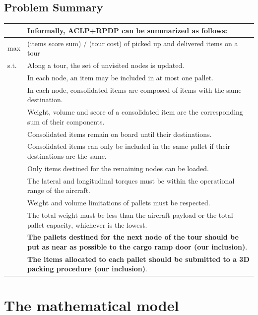 \documentclass[preprint,authoryear]{elsarticle}
\begin{document}
\subsection{Problem Summary}


\bgroup
\def\arraystretch{1.2}
\begin{table}[H]
	\centering
	\small
	\begin{tabular}{MT}
		&Informally, ACLP+RPDP can be summarized as follows:\\
		\midrule
		max &  (items score sum) / (tour cost) of picked up and delivered items on a tour  \\
		\midrule
s.t.    & Along a tour, the set of unvisited nodes is updated. \\
		& In each node, an item may be included in at most one pallet.\\		
		& In each node, consolidated items are composed of items with the same destination. \\
		& Weight, volume and score of a consolidated item are the corresponding sum of their components.\\
		& Consolidated items remain on board until their destinations.\\	
		& Consolidated items can only be included in the same pallet if their destinations are the same.\\
		& Only items destined for the remaining nodes can be loaded.  \\
		& The lateral and longitudinal torques must be within the operational range of the aircraft.\\
		& Weight and volume limitations of pallets must be respected.\\
		& The total weight must be less than the aircraft payload or the total pallet capacity, whichever is the lowest.\\	
		& {\bf The pallets destined for the next node of the tour should be put as near as possible to the cargo ramp door (our inclusion)}.\\
		& {\bf The items allocated to each pallet should be submitted to a 3D packing procedure (our inclusion)}.\\				
		\midrule
	\end{tabular}
	\normalsize
\end{table}
\egroup 


\section{The mathematical model}
\label{sec4}
\end{document}
